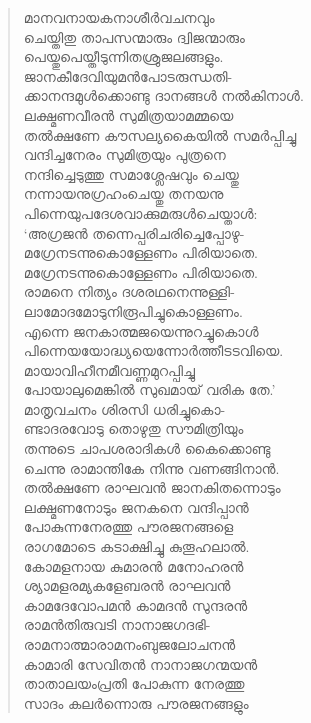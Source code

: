 \begin{verse}
മാനവനായകനാശീര്‍വചനവും\\
ചെയ്തിതു താപസന്മാരും ദ്വിജന്മാരും\\
പെയ്തുപെയ്തീടുന്നിതശ്രുജലങ്ങളും.\\
ജാനകീദേവിയുമന്‍പോടരുന്ധതി-\\
ക്കാനന്ദമുള്‍ക്കൊണ്ടു ദാനങ്ങള്‍ നല്‍കിനാള്‍.\\
ലക്ഷ്മണവീരന്‍ സുമിത്രയാമമ്മയെ\\
തല്‍ക്ഷണേ കൗസല്യകൈയില്‍ സമര്‍പ്പിച്ചു\\
വന്ദിച്ചനേരം സുമിത്രയും പുത്രനെ\\
നന്ദിച്ചെടുത്തു സമാശ്ലേഷവും ചെയ്തു\\
നന്നായനുഗ്രഹംചെയ്തു തനയനു\\
പിന്നെയുപദേശവാക്കുമരുള്‍ചെയ്താള്‍:\\
‘അഗ്രജന്‍ തന്നെപ്പരിചരിച്ചെപ്പോഴു-\\
മഗ്രേനടന്നുകൊള്ളേണം പിരിയാതെ.\\
മഗ്രേനടന്നുകൊള്ളേണം പിരിയാതെ.\\
രാമനെ നിത്യം ദശരഥനെന്നുള്ളി-\\
ലാമോദമോടുനിരൂപിച്ചുകൊള്ളണം.\\
എന്നെ ജനകാത്മജയെന്നുറച്ചുകൊള്‍\\
പിന്നെയയോദ്ധ്യയെന്നോര്‍ത്തീടടവിയെ.\\
മായാവിഹീനമീവണ്ണമുറപ്പിച്ചു\\
പോയാലുമെങ്കില്‍ സുഖമായ് വരിക തേ.’\\
മാതൃവചനം ശിരസി ധരിച്ചുകൊ-\\
ണ്ടാദരവോടു തൊഴുതു സൗമിത്രിയും\\
തന്നുടെ ചാപശരാദികള്‍ കൈക്കൊണ്ടു\\
ചെന്നു രാമാന്തികേ നിന്നു വണങ്ങിനാന്‍.\\
തല്‍ക്ഷണേ രാഘവന്‍ ജാനകിതന്നൊടും\\
ലക്ഷ്മണനോടും ജനകനെ വന്ദിപ്പാന്‍\\
പോകുന്നനേരത്തു പൗരജനങ്ങളെ\\
രാഗമോടെ കടാക്ഷിച്ചു കുതൂഹലാല്‍.\\
കോമളനായ കുമാരന്‍ മനോഹരന്‍\\
ശ്യാമളരമ്യകളേബരന്‍ രാഘവന്‍\\
കാമദേവോപമന്‍ കാമദന്‍ സുന്ദരന്‍\\
രാമന്‍തിരുവടി നാനാജഗദഭി-\\
രാമനാത്മാരാമനംബുജലോചനന്‍\\
കാമാരി സേവിതന്‍ നാനാജഗന്മയന്‍\\
താതാലയംപ്രതി പോകുന്ന നേരത്തു\\
സാദം കലര്‍ന്നൊരു പൗരജനങ്ങളും\\

\end{verse}
